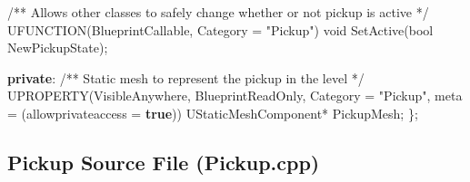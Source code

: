 \documentclass[
  letterpaper,
  DIV=11,
  numbers=noendperiod]{scrartcl}
\newenvironment{Shaded}{\begin{snugshade}}{\end{snugshade}}
\newcommand{\CommentTok}[1]{\textcolor[rgb]{0.37,0.37,0.37}{#1}}
\newcommand{\DataTypeTok}[1]{\textcolor[rgb]{0.68,0.00,0.00}{#1}}
\newcommand{\KeywordTok}[1]{\textcolor[rgb]{0.00,0.23,0.31}{\textbf{#1}}}
\newcommand{\NormalTok}[1]{\textcolor[rgb]{0.00,0.23,0.31}{#1}}
\newcommand{\OperatorTok}[1]{\textcolor[rgb]{0.37,0.37,0.37}{#1}}
\newcommand{\StringTok}[1]{\textcolor[rgb]{0.13,0.47,0.30}{#1}}
\begin{document}
\begin{Shaded}
\begin{Highlighting}[]
    \CommentTok{/** Allows other classes to safely change whether or not pickup is active */}
\NormalTok{    UFUNCTION}\OperatorTok{(}\NormalTok{BlueprintCallable}\OperatorTok{,}\NormalTok{ Category }\OperatorTok{=} \StringTok{"Pickup"}\OperatorTok{)}
    \DataTypeTok{void}\NormalTok{ SetActive}\OperatorTok{(}\DataTypeTok{bool}\NormalTok{ NewPickupState}\OperatorTok{);}

\KeywordTok{private}\OperatorTok{:}
    \CommentTok{/** Static mesh to represent the pickup in the level */}
\NormalTok{    UPROPERTY}\OperatorTok{(}\NormalTok{VisibleAnywhere}\OperatorTok{,}\NormalTok{ BlueprintReadOnly}\OperatorTok{,}\NormalTok{ Category }\OperatorTok{=} \StringTok{"Pickup"}\OperatorTok{,}\NormalTok{ meta }\OperatorTok{=} \OperatorTok{(}\NormalTok{allowprivateaccess }\OperatorTok{=} \KeywordTok{true}\OperatorTok{))}
\NormalTok{    UStaticMeshComponent}\OperatorTok{*}\NormalTok{ PickupMesh}\OperatorTok{;}
\OperatorTok{\};}
\end{Highlighting}
\end{Shaded}

\subsection{Pickup Source File
(Pickup.cpp)}\label{pickup-source-file-pickup.cpp}
\end{document}

